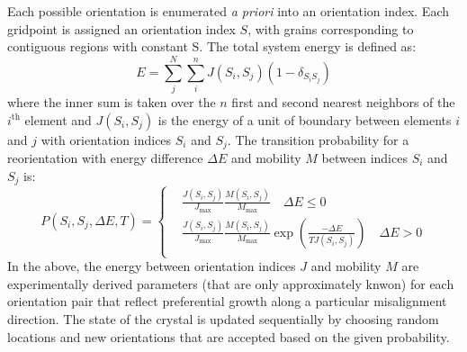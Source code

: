 \documentclass[11pt]{article}
\newcommand{\MarginPar}[1]{\marginpar{%
\vskip-\baselineskip %
\raggedright\tiny\sffamily
\hrule\smallskip{\color{red}#1}\par\smallskip\hrule}}
\begin{document}
%
Each possible orientation is enumerated {\it{a priori}} into an
orientation index. Each gridpoint 
is assigned an orientation index $S$, with grains corresponding to contiguous regions with constant S.
The total system energy is defined as:
\begin{equation}
  \label{eq:mcgrainE}
  E = \sum_j^N \sum_i^n J(S_i, S_j) (1-\delta_{S_iS_j})
\end{equation}
where the inner sum is taken over the $n$ first and second nearest neighbors of the $i^\mathrm{th}$ element and $J(S_i,S_j)$ is the energy of a unit of boundary between elements $i$ and $j$ with orientation indices $S_i$ and $S_j$. The transition probability for a reorientation with energy difference $\Delta E$ and mobility $M$ between indices $S_i$ and $S_j$ is:
\begin{equation}
  \label{eq:mcgrainP}
  P( S_i, S_j, \Delta E, T) = \left\{ \begin{aligned}
      & \frac{J(S_i,S_j)}{J_\mathrm{max}} \frac{ M(S_i, S_j) }{M_\mathrm{max}}  \quad \Delta E \le 0 \\
      & \frac{J(S_i,S_j)}{J_\mathrm{max}} \frac{ M(S_i, S_j) }{M_\mathrm{max}} \exp \left( \frac{-\Delta E}{TJ(S_i,S_j)}\right)  \quad \Delta E > 0 \\
      \end{aligned}
      \right. 
\end{equation}
In the above, the energy between orientation indices $J$ and mobility
$M$ are experimentally derived parameters (that are only approximately
knwon) for each
%
orientation pair that reflect preferential growth along a particular misalignment direction.
The state of the crystal is updated sequentially by choosing random locations and new orientations that
are accepted based on the given probability. 
\end{document}
